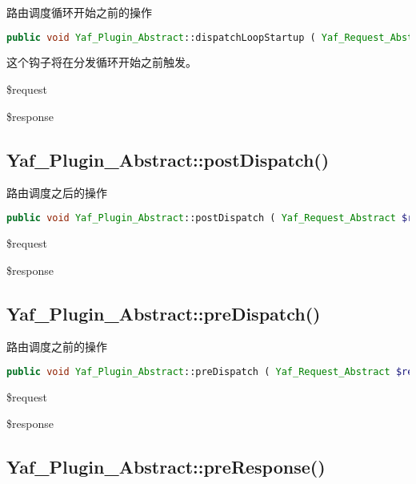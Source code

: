 路由调度循环开始之前的操作


\begin{lstlisting}[language=PHP]
public void Yaf_Plugin_Abstract::dispatchLoopStartup ( Yaf_Request_Abstract $request , Yaf_Response_Abstract $response )
\end{lstlisting}

这个钩子将在分发循环开始之前触发。

\begin{compactitem}
\item \$request
\item \$response
\end{compactitem}



\subsection{Yaf\_Plugin\_Abstract::postDispatch()}

路由调度之后的操作


\begin{lstlisting}[language=PHP]
public void Yaf_Plugin_Abstract::postDispatch ( Yaf_Request_Abstract $request , Yaf_Response_Abstract $response )
\end{lstlisting}

\begin{compactitem}
\item \$request
\item \$response
\end{compactitem}

\subsection{Yaf\_Plugin\_Abstract::preDispatch()}

路由调度之前的操作


\begin{lstlisting}[language=PHP]
public void Yaf_Plugin_Abstract::preDispatch ( Yaf_Request_Abstract $request , Yaf_Response_Abstract $response )
\end{lstlisting}

\begin{compactitem}
\item \$request
\item \$response
\end{compactitem}


\subsection{Yaf\_Plugin\_Abstract::preResponse()}

